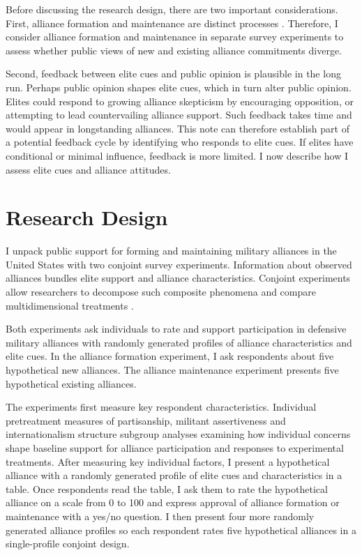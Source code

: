 \documentclass[12pt]{article}
\begin{document}
Before discussing the research design, there are two important considerations. 
First, alliance formation and maintenance are distinct processes \citep{Snyder1997}. 
Therefore, I consider alliance formation and maintenance in separate survey experiments to assess whether public views of new and existing alliance commitments diverge. 


Second, feedback between elite cues and public opinion is plausible in the long run. 
Perhaps public opinion shapes elite cues, which in turn alter public opinion. 
Elites could respond to growing alliance skepticism by encouraging opposition, or attempting to lead countervailing alliance support.
Such feedback takes time and would appear in longstanding alliances.
This note can therefore establish part of a potential feedback cycle by identifying who responds to elite cues.  
If elites have conditional or minimal influence, feedback is more limited.
I now describe how I assess elite cues and alliance attitudes. 



\section{Research Design}



I unpack public support for forming and maintaining military alliances in the United States with two conjoint survey experiments. 
Information about observed alliances bundles elite support and alliance characteristics. 
Conjoint experiments allow researchers to decompose such composite phenomena and compare multidimensional treatments \citep{Hainmuelleretal2014}. 


Both experiments ask individuals to rate and support participation in defensive military alliances with randomly generated profiles of alliance characteristics and elite cues. 
In the alliance formation experiment, I ask respondents about five hypothetical new alliances. 
The alliance maintenance experiment presents five hypothetical existing alliances.


The experiments first measure key respondent characteristics.  
Individual pretreatment measures of partisanship, militant assertiveness and internationalism structure subgroup analyses examining how individual concerns shape baseline support for alliance participation and responses to experimental treatments. 
After measuring key individual factors, I present a hypothetical alliance with a randomly generated profile of elite cues and characteristics in a table.
Once respondents read the table, I ask them to rate the hypothetical alliance on a scale from 0 to 100 and express approval of alliance formation or maintenance with a yes/no question. 
I then present four more randomly generated alliance profiles so each respondent rates five hypothetical alliances in a single-profile conjoint design.
\end{document}
